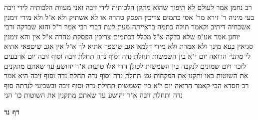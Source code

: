 \documentclass[12pt, openany]{book}
\newcommand{\sectname}{}
\newcommand{\newsection}[1]{
	\addcontentsline{toc}{section}{#1}
	\renewcommand{\sectname}{#1}	
	\vspace{-\baselineskip}
	\begin{center}
		\textbf{%
\fontsize{16pt}{16pt}\selectfont
			#1}
	\end{center}
	\vspace{-\baselineskip}
	\nopagebreak
}
\begin{document}
{רב נחמן אמר לעולם לא תיפוך שהוא מתקן הלכותיה לידי זיבה
ואני מעוות הלכותיה לידי זיבה 
בעי מיניה ר' זירא מר' אסי כתמים צריכין הפסק טהרה או לא אשתיק ולא א"ל ולא מידי 
זימנין אשכחיה דיתיב וקאמר תולה כתמה בראייתה מעת לעת דברי רבי 
אמר ר"ל והוא שבדקה ורבי יוחנן אמר אע"פ שלא בדקה 
א"ל מכלל דכתמים צריכין הפסקת טהרה א"ל אין והא זימנין סגיאין בעא מינך ולא אמרת ולא מידי דלמא אגב שיטפך אתיא לך א"ל אין אגב שיטפאי אתיא לי
{\large\emph{מתני׳}} הרואה יום י"א בין השמשות תחלת נדה וסוף נדה תחלת זיבה וסוף זיבה 
יום ארבעים לזכר ויום שמונים לנקבה בין השמשות לכולן הרי אלו טועות
א"ר יהושע עד שאתם מתקנים את השוטות באו ותקנו את הפקחות
{\large\emph{גמ׳}} תחלת נדה וסוף נדה תחלת נדה וסוף זיבה היא 
אמר רב חסדא הכי קאמר הרואה יום י"א בין השמשות תחילת נדה וסוף זיבה
ובשביעי לנדתה סוף נדה ותחלת זיבה
א"ר יהושע עד שאתם מתקנין את השוטות כו' הני}

\newsection{דף נד}
\end{document}
